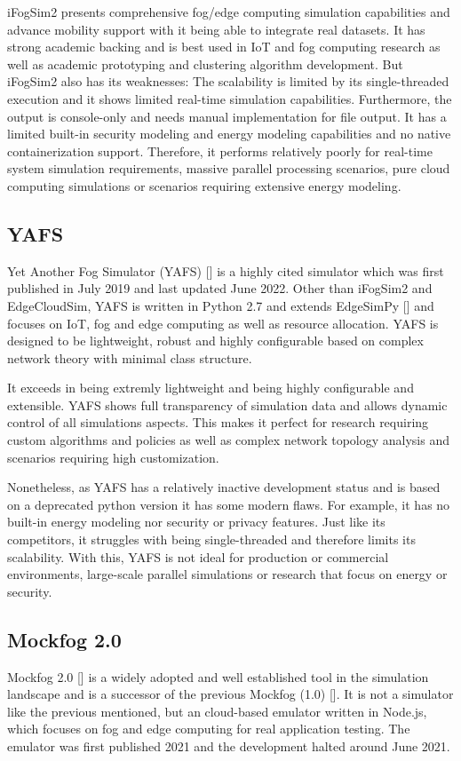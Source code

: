 iFogSim2 presents comprehensive fog/edge computing simulation capabilities and advance mobility support with it being able to integrate real datasets.
It has strong academic backing and is best used in IoT and fog computing research as well as academic prototyping and clustering algorithm development.
But iFogSim2 also has its weaknesses:
The scalability is limited by its single-threaded execution and it shows limited real-time simulation capabilities.
Furthermore, the output is console-only and needs manual implementation for file output.
It has a limited built-in security modeling and energy modeling capabilities and no native containerization support.
Therefore, it performs relatively poorly for real-time system simulation requirements, massive parallel processing scenarios, pure cloud computing simulations or 
scenarios requiring extensive energy modeling.

\subsection{YAFS}
Yet Another Fog Simulator (YAFS) [\cite{sim-yafs}] is a highly cited simulator which was first published in July 2019 and last updated June 2022.
Other than iFogSim2 and EdgeCloudSim, YAFS is written in Python 2.7 and extends EdgeSimPy [\cite{sim-base-edgeSimpy}] and focuses on IoT, fog and edge computing as well as resource allocation.
YAFS is designed to be lightweight, robust and highly configurable based on complex network theory with minimal class structure.

It exceeds in being extremly lightweight and being highly configurable and extensible. 
YAFS shows full transparency of simulation data and allows dynamic control of all simulations aspects.
This makes it perfect for research requiring custom algorithms and policies as well as complex network topology analysis and scenarios requiring high customization.

Nonetheless, as YAFS has a relatively inactive development status and is based on a deprecated python version it has some modern flaws.
For example, it has no built-in energy modeling nor security or privacy features.
Just like its competitors, it struggles with being single-threaded and therefore limits its scalability.
With this, YAFS is not ideal for production or commercial environments, large-scale parallel simulations or research that focus on energy or security.

\subsection{Mockfog 2.0}
Mockfog 2.0 [\cite{sim-mockfog2}] is a widely adopted and well established tool in the simulation landscape and is a successor of the previous Mockfog (1.0) [\cite{sim-base-mockfog1}].
It is not a simulator like the previous mentioned, but an cloud-based emulator written in Node.js, which focuses on fog and edge computing for real application testing.
The emulator was first published 2021 and the development halted around June 2021.

